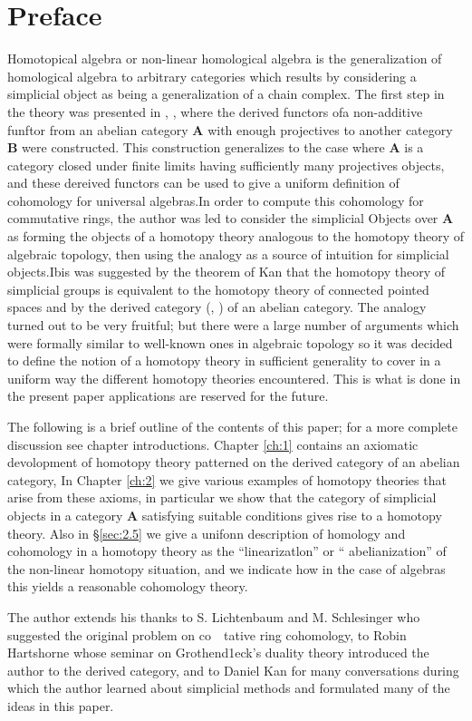 \documentclass[../main]{subfiles}
\begin{document}
\chapter*{Preface}

Homotopical algebra or non-linear homological algebra is the
generalization of homological algebra to arbitrary categories
which results by considering a simplicial object as being a generalization of a chain complex. The first step in the theory was presented in \cite{dold_homology_1958}, \cite{dold_homologie_1961}, where the derived functors ofa  non-additive funftor from an abelian category $\mathbf{A}$ with enough projectives to another category $\mathbf{B}$ were constructed. This construction generalizes to the case where $\mathbf{A}$ is a category closed under finite limits having sufficiently many projectives objects, and these dereived functors can be used to give a uniform definition of cohomology for universal algebras.In order to compute this cohomology for commutative rings, the author was led to consider the
simplicial Objects over $\mathbf{A}$ as forming the objects of a homotopy
theory analogous to the homotopy theory of algebraic topology,
then using the analogy as a source of intuition for simplicial
objects.Ibis was suggested by the theorem of Kan \cite{kan_homotopy_1958} that the
homotopy theory of simplicial groups is equivalent to the homotopy theory of connected pointed spaces and by the derived category (\cite{hartshorne_residues_1966}, \cite{verdier_categories_nodate}) of an abelian category. The analogy turned out
to be very fruitful; but there were a large number of arguments which were formally similar to well-known ones in algebraic topology so it was decided to define the notion of a homotopy theory
in sufficient generality to cover in a uniform way the different
homotopy theories encountered. This is what is done in the present paper applications are reserved for the future. 

The following is a brief outline of the contents of this paper; for a more complete discussion see chapter introductions. Chapter \ref{ch:1} contains an axiomatic devolopment of homotopy theory patterned on the derived category of an abelian category, In Chapter \ref{ch:2} we
give various examples of homotopy theories that arise from these
axioms, in particular we show that the category of simplicial objects in a category $\mathbf{A}$ satisfying suitable conditions gives rise
to a homotopy theory. Also in \S\ref{sec:2.5} we give a unifonn description
of homology and cohomology in a homotopy theory as the ``linearizatlon'' or `` abelianization'' of the non-linear homotopy situation,
and we indicate how in the case of algebras this yields a reasonable cohomology theory.

The author extends his thanks to S. Lichtenbaum and
M. Schlesinger who suggested the original problem on co~~tative
ring cohomology, to Robin Hartshorne whose seminar \cite{hartshorne_residues_1966} on
Grothend1eck's duality theory introduced the author to the derived
category, and to Daniel Kan for many conversations during which
the author learned about simplicial methods and formulated many
of the ideas in this paper.
\end{document}
